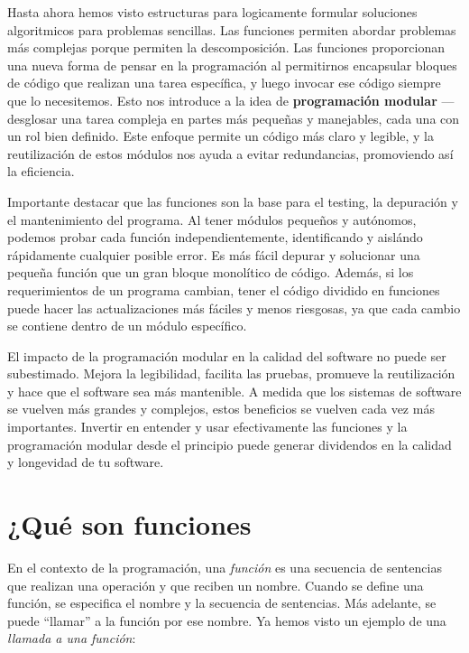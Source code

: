 Hasta ahora hemos visto estructuras para logicamente formular soluciones algoritmicos para problemas sencillas. Las funciones permiten abordar problemas más complejas porque permiten la descomposición. Las funciones proporcionan una nueva forma de pensar en la programación al permitirnos encapsular bloques de código que realizan una tarea específica, y luego invocar ese código siempre que lo necesitemos. Esto nos introduce a la idea de \textbf{programación modular} — desglosar una tarea compleja en partes más pequeñas y manejables, cada una con un rol bien definido. Este enfoque permite un código más claro y legible, y la reutilización de estos módulos nos ayuda a evitar redundancias, promoviendo así la eficiencia.

Importante destacar que las funciones son la base para el testing, la depuración y el mantenimiento del programa. Al tener módulos pequeños y autónomos, podemos probar cada función independientemente, identificando y aislándo rápidamente cualquier posible error. Es más fácil depurar y solucionar una pequeña función que un gran bloque monolítico de código. Además, si los requerimientos de un programa cambian, tener el código dividido en funciones puede hacer las actualizaciones más fáciles y menos riesgosas, ya que cada cambio se contiene dentro de un módulo específico.

El impacto de la programación modular en la calidad del software no puede ser subestimado. Mejora la legibilidad, facilita las pruebas, promueve la reutilización y hace que el software sea más mantenible. A medida que los sistemas de software se vuelven más grandes y complejos, estos beneficios se vuelven cada vez más importantes. Invertir en entender y usar efectivamente las funciones y la programación modular desde el principio puede generar dividendos en la calidad y longevidad de tu software.


\hypertarget{functionchap}{%
\section{¿Qué son funciones}\label{functionchap}}


En el contexto de la programación, una \emph{función} es una secuencia
de sentencias que realizan una operación y que reciben un nombre. Cuando
se define una función, se especifica el nombre y la secuencia de
sentencias. Más adelante, se puede ``llamar'' a la función por ese
nombre. Ya hemos visto un ejemplo de una \emph{llamada a una función}:

